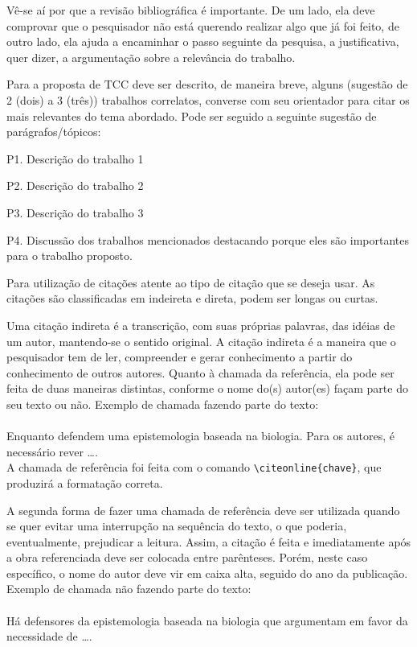 Vê-se aí por que a revisão bibliográfica é importante. De um lado, ela deve comprovar que o pesquisador não está querendo realizar algo que já foi feito, de outro lado, ela ajuda a encaminhar o passo seguinte da pesquisa, a justificativa, quer dizer, a argumentação sobre a relevância do trabalho.

Para a proposta de TCC deve ser descrito, de maneira breve, alguns (sugestão de 2 (dois) a 3 (três)) trabalhos correlatos, converse com seu orientador para citar os mais relevantes do tema abordado. Pode ser seguido a seguinte sugestão de parágrafos/tópicos:

P1. Descrição do trabalho 1

P2. Descrição do trabalho 2

P3. Descrição do trabalho 3

P4. Discussão dos trabalhos mencionados destacando porque eles são importantes para o trabalho proposto.

Para utilização de citações atente ao tipo de citação que se deseja usar. As citações são classificadas em indeireta e direta, podem ser longas ou curtas.

Uma citação indireta é a transcrição, com suas próprias palavras, das idéias de um autor, mantendo-se o sentido original. A citação indireta é a maneira que o pesquisador tem de ler, compreender e gerar conhecimento a partir do conhecimento de outros autores. Quanto à chamada da referência, ela pode ser feita de duas maneiras distintas, conforme o nome do(s) autor(es) façam parte do seu texto ou não. Exemplo de chamada fazendo parte do texto:\\
\\Enquanto {} defendem uma epistemologia baseada na biologia. Para os autores, é necessário rever \ldots.\\

A chamada de referência foi feita com o comando \verb|\citeonline{chave}|, que produzirá a formatação correta.

A segunda forma de fazer uma chamada de referência deve ser utilizada quando se quer evitar uma interrupção na sequência do texto, o que poderia, eventualmente, prejudicar a leitura. Assim, a citação é feita e imediatamente após a obra referenciada deve ser colocada entre parênteses. Porém, neste caso específico, o nome do autor deve vir em caixa alta, seguido do ano da publicação. Exemplo de chamada não fazendo parte do texto:\\
\\Há defensores da epistemologia baseada na biologia que argumentam em favor da necessidade de \ldots \cite{Maturana2003}.\\

